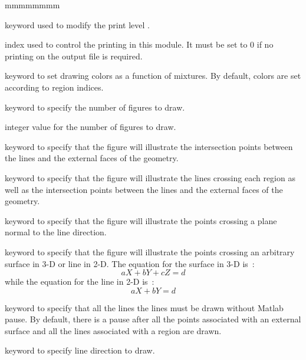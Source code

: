 \begin{ListeDeDescription}{mmmmmmmm}   

\item[\moc{EDIT}] keyword used to modify the print level .

\item[\dusa{iprint}] index used to control the printing in this module. It must be set to 0 if no printing on the output
file is required. 

\item[\moc{MIXTURE}] keyword to set drawing colors as a function of mixtures. By default, colors are set according to region indices.

\item[\moc{NTPO}] keyword to specify the number of figures to draw.

\item[\dusa{nplots}] integer value for the number of figures to draw.

\item[\moc{POINTS}] keyword to specify that the figure will illustrate the intersection points between the lines and the external faces of the geometry.

\item[\moc{DIRECTIONS}] keyword to specify that the figure will illustrate the lines crossing each region as well as the intersection points between the lines
and the external faces of the geometry.

\item[\moc{PLANP}] keyword to specify that the figure will illustrate the points crossing a plane normal to the line direction.

\item[\moc{PLANA}] keyword to specify that the figure will illustrate the points crossing an arbitrary surface in 3-D or line in 2-D. The equation for the
surface in 3-D is~:
$$
\textit{a} X + \textit{b} Y + \textit{c} Z =\textit{d} 
$$
while the equation for the line in 2-D is~:
$$
\textit{a} X + \textit{b} Y =\textit{d} 
$$

\item[\moc{NoPause}] keyword to specify that all the lines the lines must be drawn without Matlab pause. By default, there is a pause after all the points
associated with an external surface and all the lines associated with a region are drawn.

\item[\moc{DIR}] keyword to specify line direction to draw.


\end{ListeDeDescription}

